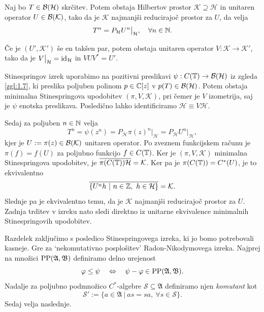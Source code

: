 \begin{posledica} \label{pos:1.4}
    Naj bo $T \in \operatorname{\mathcal{B} (\mathcal{H})}$ skrčitev. Potem obstaja Hilbertov prostor $\mathcal{K} \supseteq \mathcal{H}$
    in unitaren operator $U \in \operatorname{\mathcal{B} (\mathcal{K})}$, tako da je $\mathcal{K}$ najmanjši reducirajoč prostor za $U$, da velja 
    $$T^n = P_{\mathcal{H}} U^n \big|_{\mathcal{H}},\quad \forall n \in \mathbb N.$$

    Če je $(U', \mathcal{K}')$ še en takšen par,
    potem obstaja unitaren operator $V: \mathcal{K} \to \mathcal{K}'$, tako da je $V\big|_{\mathcal{H}} = \operatorname{id}_{\mathcal{H}}$
    in $V U V^* = U'$. 
\end{posledica}

\begin{dokaz}
    Stinespringov izrek uporabimo na pozitivni preslikavi $\psi: C(\mathbb T) \to \operatorname{\mathcal{B} (\mathcal{H})}$ iz zgleda \ref{zgl:1.7},
    ki preslika poljuben polinom $p \in \mathbb C[z]$ v $p(T) \in \operatorname{\mathcal{B} (\mathcal{H})}$. 
    Potem obstaja minimalna Stinespringova upodobitev $(\pi, V, \mathcal{K})$,
    pri čemer je $V$ izometrija, saj je $\psi$ enotska preslikava. 
    Posledično lahko identificiramo $\mathcal{H} \equiv V \mathcal{H}$.

    Sedaj za poljuben $n \in \mathbb N$ velja
    $$T^n = \psi(z^n) = P_{\mathcal{H}} \pi(z) ^n \big|_{\mathcal{H}} = P_{\mathcal{H}} U ^n \big|_{\mathcal{H}},$$
    kjer je $U := \pi(z) \in \operatorname{\mathcal{B} (\mathcal{K})}$ unitaren operator.
    Po zveznem funkcijskem računu je $\pi(f) = f(U)$ za poljubno funkcijo $f \in C(\mathbb T)$.
    Ker je $(\pi, V, \mathcal{K})$ minimalna Stinespringova upodobitev, je $\overline{\pi(C(\mathbb T)) \mathcal{H}} = \mathcal{K}$.
    Ker pa je $\pi(C(\mathbb T)) = C^*(U)$, je to ekvivalentno $$\overline{\{U^n h\ |\ n \in \mathbb Z,\ h \in \mathcal{H}\}} = \mathcal{K}.$$
    Slednje pa je ekvivalentno temu, da je $\mathcal{K}$ najmanjši reducirajoč prostor za $U$.
    Zadnja trditev v izreku nato sledi direktno iz unitarne ekvivalence minimalnih Stinespringovih upodobitev.
\end{dokaz}


Razdelek zaključimo s posledico Stinespringovega izreka, ki jo bomo potrebovali kasneje.
Gre za `nekomutativno posplošitev' Radon-Nikodymovega izreka.
Najprej na množici $\operatorname{PP}(\mathfrak{A}, \mathfrak{B})$ definiramo delno urejenost  
$$\varphi \leq \psi \quad \Leftrightarrow \quad \psi - \varphi \in \operatorname{PP}(\mathfrak{A}, \mathfrak{B}).$$
Nadalje za poljubno podmnožico $C^*$-algebre $\mathcal{S} \subseteq \mathfrak{A}$ definiramo njen \emph{komutant} kot
$$\mathcal{S}' := \{a \in \mathfrak{A}\ |\ as = sa,\ \forall s \in \mathcal{S}\}.$$
Sedaj velja naslednje.

